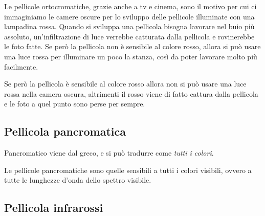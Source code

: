 Le pellicole ortocromatiche, grazie anche a tv e cinema, sono il motivo per cui ci immaginiamo le camere oscure per lo sviluppo delle pellicole illuminate con una lampadina rossa.
Quando si sviluppa una pellicola bisogna lavorare nel buio più assoluto, un'infiltrazione di luce verrebbe catturata dalla pellicola e rovinerebbe le foto fatte.
Se però la pellicola  non è sensibile al colore rosso, allora si può usare una luce rossa per illuminare un poco la stanza, così da poter lavorare molto più facilmente.

Se però la pellicola è sensibile al colore rosso allora non si può usare una luce rossa nella camera oscura, altrimenti il rosso viene di fatto cattura dalla pellicola e le foto a quel punto sono perse per sempre.


\subsection{Pellicola pancromatica} \label{subsec:pellicolapan}
Pancromatico viene dal greco, e si può tradurre come \textit{tutti i colori}.

Le pellicole pancromatiche sono quelle sensibili a tutti i colori visibili, ovvero a tutte le lunghezze d'onda dello spettro visibile.


\subsection{Pellicola infrarossi} \label{subsec:pellicolair}
